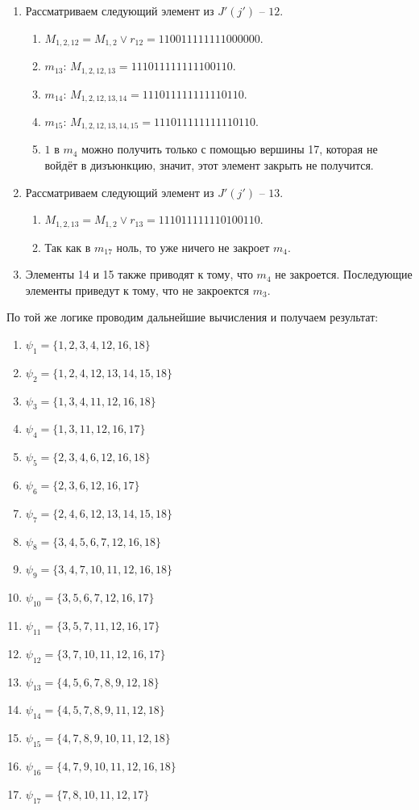 \documentclass[12pt, a4paper] {ncc}
\begin{document}
\begin{enumerate}
\begin{enumerate}
\begin{enumerate}
	\end{enumerate}
\item Рассматриваем следующий элемент из $J'(j')$ -- $12$.
    \begin{enumerate}
		\item $M_{1,2,12} = M_{1,2} \lor r_{12} = 110011111111000000.$
		\item $m_{13}$: $M_{1, 2, 12,13} = 111011111111100110$.
		\item $m_{14}$: $M_{1, 2, 12,13,14} = 111011111111110110$.
		\item $m_{15}$: $M_{1, 2, 12,13,14,15} = 111011111111110110$.
		\item $1$ в $m_4$ можно получить только с помощью вершины 17, которая не войдёт в дизъюнкцию, значит, этот элемент закрыть не получится.
	\end{enumerate}
\item Рассматриваем следующий элемент из $J'(j')$ -- $13$.
    \begin{enumerate}
		\item $M_{1,2,13} = M_{1,2} \lor r_{13} = 111011111110100110.$
		\item Так как в $m_{17}$ ноль, то уже ничего не закроет $m_4$.
    \end{enumerate}
\item Элементы 14 и 15 также приводят к тому, что $m_4$ не закроется. Последующие элементы приведут к тому, что не закроектся $m_3$.
\end{enumerate}
\end{enumerate}

По той же логике проводим дальнейшие вычисления и получаем результат:
\begin{enumerate}
	\item $\psi_1 = \{ 1,2,3,4,12,16,18 \}$
	\item $\psi_2 = \{ 1,2,4,12,13,14,15,18 \}$
	\item $\psi_3 = \{ 1,3,4,11,12,16,18 \}$
	\item $\psi_4 = \{ 1,3,11,12,16,17 \}$
	\item $\psi_5 = \{ 2,3,4,6,12,16,18 \}$
	\item $\psi_6 = \{ 2,3,6,12,16,17 \}$
	\item $\psi_7 = \{ 2,4,6,12,13,14,15,18 \}$
	\item $\psi_8 = \{ 3,4,5,6,7,12,16,18 \}$
	\item $\psi_9 = \{ 3,4,7,10,11,12,16,18 \}$
	\item $\psi_{10}= \{ 3,5,6,7,12,16,17 \}$
	\item $\psi_{11}= \{ 3,5,7,11,12,16,17 \}$
	\item $\psi_{12}= \{ 3,7,10,11,12,16,17 \}$
	\item $\psi_{13}= \{ 4,5,6,7,8,9,12,18 \}$
	\item $\psi_{14}= \{ 4,5,7,8,9,11,12,18 \}$
	\item $\psi_{15}= \{ 4,7,8,9,10,11,12,18 \}$
	\item $\psi_{16}= \{ 4,7,9,10,11,12,16,18 \}$
	\item $\psi_{17}= \{ 7,8,10,11,12,17 \}$
\end{enumerate}
\end{document}
